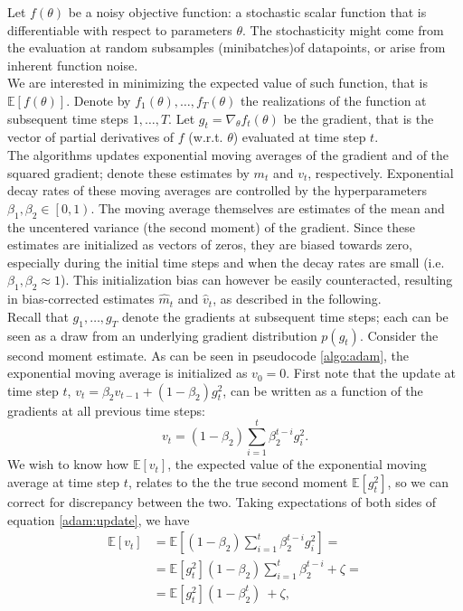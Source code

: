 \documentclass[%
    corpo=11pt,
    twoside,
    stile=classica,
    oldstyle,
    autoretitolo,
    tipotesi=magistrale,
    greek,
    evenboxes,
    english
]{toptesi}
\begin{document}
Let $f(\theta)$ be a noisy objective function: a stochastic scalar function that is differentiable with respect to parameters $\theta$. The stochasticity might come from the evaluation at random subsamples (minibatches)of datapoints, or arise from inherent function noise.\\
We are interested in minimizing the expected value of such function, that is $\mathbb{E}\left[f(\theta)\right]$. Denote by $f_1(\theta), \dots,f_T(\theta)$ the realizations of the function at subsequent time steps $1,\dots, T$. Let $g_t = \nabla_{\theta}f_t(\theta)$ be the gradient, that is the vector of partial derivatives of $f$ (w.r.t. $\theta$) evaluated at time step $t$. \\
The algorithms updates exponential moving averages of the gradient and of the squared gradient; denote these estimates by $m_t$ and $v_t$, respectively. Exponential decay rates of these moving averages are controlled by the hyperparameters $\beta_1,\beta_2 \in \left[0,1\right)$. The moving average themselves are estimates of the mean and the uncentered variance (the second moment) of the gradient. Since these estimates are initialized as vectors of zeros, they are biased towards zero, especially during the initial time steps and when the decay rates are small (i.e. $\beta_1,\beta_2 \approx 1$). This initialization bias can however be easily counteracted, resulting in bias-corrected estimates $\hat{m}_t$ and $\hat{v}_t$, as described in the following. \\
Recall that $g_1,\dots,g_T$ denote the gradients at subsequent time steps; each can be seen as a draw from an underlying gradient distribution $p(g_t)$. Consider the second moment estimate. As can be seen in pseudocode \ref{algo:adam}, the exponential moving average is initialized as $v_0 = 0$. First note that the update at time step $t$, $v_t = \beta_2v_{t-1} + (1 -\beta_2)g_t^{2}$, can be written as a function of the gradients at all previous time steps:
\begin{equation}
\label{adam:update}
v_t = (1 - \beta_2)\sum_{i=1}^{t}\beta_2^{t-i}g_i^2.
\end{equation}
We wish to know how $\mathbb{E}\left[v_t\right]$, the expected value of the exponential moving average at time step $t$, relates to the the true second moment $\mathbb{E}\left[g_t^2 \right]$, so we can correct for discrepancy between the two. Taking expectations of both sides of equation \eqref{adam:update}, we have
\begin{align}
\mathbb{E}\left[v_t\right] &= \mathbb{E}\left[ (1 - \beta_2)\sum_{i=1}^{t}\beta_2^{t-i}g_i^2\right] = \\
&= \mathbb{E}\left[g_t^2 \right](1 - \beta_2)\sum_{i=1}^{t}\beta_2^{t-i} + \zeta = \\
&= \mathbb{E}\left[g_t^2 \right](1 - \beta_2^t)\ + \zeta,
\end{align}
\end{document}
